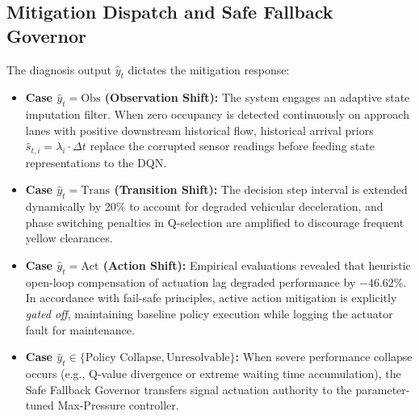 \documentclass{ieeeaccess}
\begin{document}
\subsection{Mitigation Dispatch and Safe Fallback Governor}
The diagnosis output $\hat{y}_t$ dictates the mitigation response:
\begin{itemize}
    \item \textbf{Case $\hat{y}_t = \text{Obs}$ (Observation Shift):} The system engages an adaptive state imputation filter. When zero occupancy is detected continuously on approach lanes with positive downstream historical flow, historical arrival priors $\hat{s}_{t, i} = \lambda_i \cdot \Delta t$ replace the corrupted sensor readings before feeding state representations to the DQN.
    \item \textbf{Case $\hat{y}_t = \text{Trans}$ (Transition Shift):} The decision step interval is extended dynamically by 20\% to account for degraded vehicular deceleration, and phase switching penalties in Q-selection are amplified to discourage frequent yellow clearances.
    \item \textbf{Case $\hat{y}_t = \text{Act}$ (Action Shift):} Empirical evaluations revealed that heuristic open-loop compensation of actuation lag degraded performance by $-46.62\%$. In accordance with fail-safe principles, active action mitigation is explicitly \emph{gated off}, maintaining baseline policy execution while logging the actuator fault for maintenance.
    \item \textbf{Case $\hat{y}_t \in \{\text{Policy Collapse}, \text{Unresolvable}\}$:} When severe performance collapse occurs (e.g., Q-value divergence or extreme waiting time accumulation), the Safe Fallback Governor transfers signal actuation authority to the parameter-tuned Max-Pressure controller.
\end{itemize}
\end{document}
